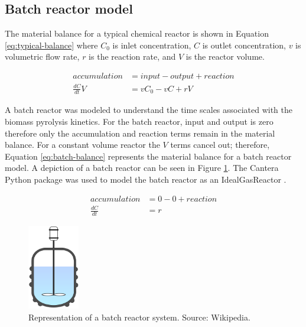 \documentclass[12pt,titlepage]{article}
\begin{document}
\subsection{Batch reactor model}

The material balance for a typical chemical reactor is shown in Equation \ref{eq:typical-balance} where $C_0$ is inlet concentration, $C$ is outlet concentration, $v$ is volumetric flow rate, $r$ is the reaction rate, and $V$ is the reactor volume.

\begin{equation}
    \label{eq:typical-balance}
    \begin{aligned}
        accumulation &= input - output + reaction \\
        \frac{dC}{dt} V &= v C_0 - v C + r V
    \end{aligned}
\end{equation}

A batch reactor was modeled to understand the time scales associated with the biomass pyrolysis kinetics. For the batch reactor, input and output is zero therefore only the accumulation and reaction terms remain in the material balance. For a constant volume reactor the $V$ terms cancel out; therefore, Equation \ref{eq:batch-balance} represents the material balance for a batch reactor model. A depiction of a batch reactor can be seen in Figure \ref{fig:batch-reactor}. The Cantera Python package was used to model the batch reactor as an IdealGasReactor \cite{Cantera-2018}.

\begin{equation}
    \label{eq:batch-balance}
    \begin{aligned}
        accumulation &= 0 - 0 + reaction \\
        \frac{dC}{dt} &= r
    \end{aligned}
\end{equation}

\begin{figure}[H]
    \centering
    \includegraphics[width=0.2\textwidth]{figures/batch-reactor.png}
    \caption{Representation of a batch reactor system. Source: Wikipedia.}
    \label{fig:batch-reactor}
\end{figure}
\end{document}
